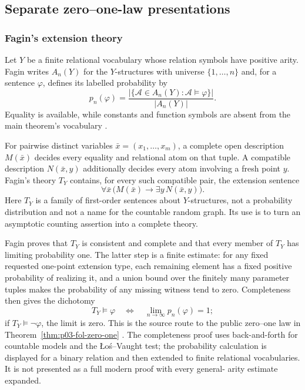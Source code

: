 
\subsection{Separate zero--one-law presentations}
\label{sec:p09-presentation-n-c-002}

\subsubsection{Fagin's extension theory}

Let \(Y\) be a finite relational vocabulary whose relation symbols have
positive arity.  Fagin writes \(A_n(Y)\) for the \(Y\)-structures with universe
\(\{1,\ldots,n\}\) and, for a sentence
\(\varphi\), defines its labelled probability by
\[
 p_n(\varphi)
 =
 \frac{\lvert\{\mathcal A\in A_n(Y):\mathcal A\models\varphi\}\rvert}
      {\lvert A_n(Y)\rvert}.
\]
Equality is available, while constants and function symbols are absent from
the main theorem's vocabulary \cite[pp.~50--51]{Fagin1976}.

For pairwise distinct variables \(\bar x=(x_1,\ldots,x_m)\), a complete open
description \(M(\bar x)\) decides every equality and relational atom on that
tuple.  A compatible description \(N(\bar x,y)\) additionally decides every
atom involving a fresh point \(y\).  Fagin's theory \(T_Y\) contains, for every
such compatible pair, the extension sentence
\[
 \forall\bar x\,
 \bigl(M(\bar x)\to\exists y\,N(\bar x,y)\bigr).
\]
Here \(T_Y\) is a family of first-order sentences about \(Y\)-structures, not
a probability distribution and not a name for the countable random graph.
Its use is to turn an asymptotic counting assertion into a complete theory.

Fagin proves that \(T_Y\) is consistent and complete and that every member of
\(T_Y\) has limiting probability one.  The latter step is a finite estimate:
for any fixed requested one-point extension type, each remaining element has a
fixed positive probability of realizing it, and a union bound over the finitely
many parameter tuples makes the probability of any missing witness tend to
zero.  Completeness then gives the dichotomy
\[
 T_Y\models\varphi
 \quad\Longleftrightarrow\quad
 \lim_{n\to\infty}p_n(\varphi)=1;
\]
if \(T_Y\models\neg\varphi\), the limit is zero.  This is the source route to
the public zero--one law in Theorem~\ref{thm:p03-fol-zero-one}
\cite[thms.~1--4]{Fagin1976}.  The completeness proof uses back-and-forth for
countable models and the \L o\'s--Vaught test; the probability calculation is
displayed for a binary relation and then extended to finite relational
vocabularies.  It is not presented as a full modern proof with every general-
arity estimate expanded.

